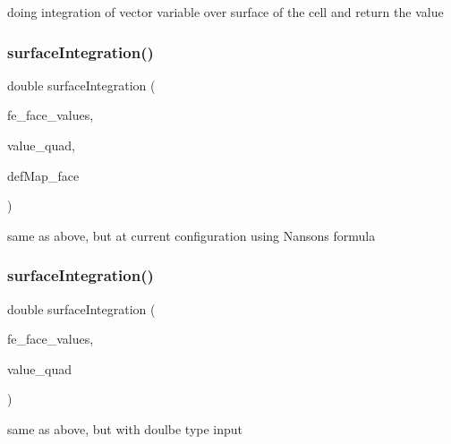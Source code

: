 doing integration of vector variable over surface of the cell and return the value \mbox{\label{class_residual_a71923ccf434fa6503c37afd0ca7d0100}} 
\subsubsection{\texorpdfstring{surface\+Integration()}{surfaceIntegration()}\hspace{0.1cm}{\footnotesize\ttfamily [4/6]}}
{\footnotesize\ttfamily double surface\+Integration (\begin{DoxyParamCaption}\item[{const F\+E\+Face\+Values$<$ dim $>$ \&}]{fe\+\_\+face\+\_\+values,  }\item[{dealii\+::\+Table$<$ 1, Sacado\+::\+Fad\+::\+D\+Fad$<$ double $>$ $>$ \&}]{value\+\_\+quad,  }\item[{\mbox{\hyperlink{structdeformation_map}{deformation\+Map}}$<$ T, dim $>$ \&}]{def\+Map\+\_\+face }\end{DoxyParamCaption})}

same as above, but at current configuration using Nanson\textquotesingle{}s formula \mbox{\label{class_residual_a454c4fd90cd46e3108e3d76eccbf2075}} 
\subsubsection{\texorpdfstring{surface\+Integration()}{surfaceIntegration()}\hspace{0.1cm}{\footnotesize\ttfamily [5/6]}}
{\footnotesize\ttfamily double surface\+Integration (\begin{DoxyParamCaption}\item[{const F\+E\+Face\+Values$<$ dim $>$ \&}]{fe\+\_\+face\+\_\+values,  }\item[{dealii\+::\+Table$<$ 1, double $>$ \&}]{value\+\_\+quad }\end{DoxyParamCaption})}

same as above, but with doulbe type input \mbox{\label{class_residual_a8c32782b660888461d7b8f8a728b2751}} 
